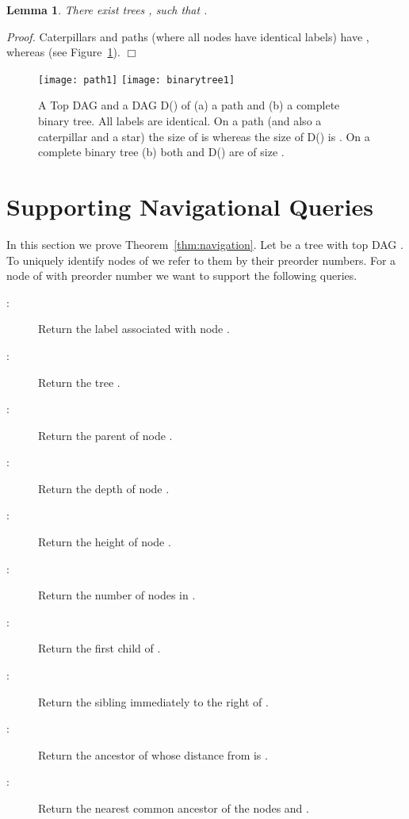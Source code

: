\documentclass [11pt]{article}
\newtheorem{lemma}{Lemma}
\newcommand{\qed}{\hfill\ensuremath{\Box}\medskip\\\noindent}
\newenvironment{proof}{\noindent\emph{Proof. }}{}
\begin{document}
\begin{lemma}\label{lem:proofbypicture}
There exist trees , such that .
\end{lemma}
\begin{proof}
Caterpillars and paths (where all nodes  have  identical labels) have 
, whereas  (see Figure~\ref{fig:compare}). \qed
\end{proof}
\begin{figure}[tb]
   \centering
\texttt{[image: path1]}\hspace{1cm}
   \texttt{[image: binarytree1]}
   \caption{A  Top DAG  and a DAG D() of (a) a path  and (b) a complete binary tree. All labels are identical. On a path (and also a caterpillar and a star) the size of  is  whereas the size of D() is . On a complete binary tree (b) both  and D() are of size .}

  \label{fig:compare}
\end{figure}



\section{Supporting Navigational Queries}\label{section4}
In this section we prove Theorem~\ref{thm:navigation}. Let  be a tree with top DAG . To uniquely identify nodes of  we refer to them by their preorder numbers. For a node of  with preorder number  we want to support the following queries. 

\begin{description}
\item[:] Return the label associated with node .
\item[:] Return the tree .
\item[:] Return the parent of node .
\item[:] Return the depth of node .
\item[:] Return the height of node .
\item[:] Return the number of nodes in .
\item[:] Return the first child of .
\item[:] Return the sibling immediately to the right of .
\item[:] Return the ancestor of  whose distance from  is .
\item[:] Return the nearest common ancestor of the nodes  and .
\end{description}
\end{document}
